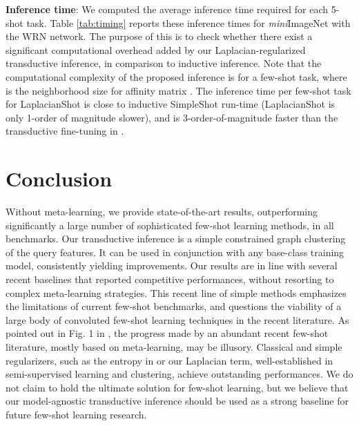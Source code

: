 \documentclass{article}
\begin{document}
\textbf{Inference time}: We computed the average inference time required for each 5-shot task. Table \ref{tab:timing} reports these inference times for \textit{mini}ImageNet with the WRN network. The purpose of this is to check whether there exist a significant computational overhead added by our Laplacian-regularized transductive inference, in comparison to inductive inference. Note that the computational complexity of the proposed inference is  for a few-shot task, where  is the neighborhood size for affinity matrix . The inference time per few-shot task for LaplacianShot is close to inductive SimpleShot run-time (LaplacianShot is only 1-order of magnitude slower), and is 3-order-of-magnitude faster than the transductive fine-tuning in \cite{Dhillon2020A}. 

\section{Conclusion}
Without meta-learning, we provide state-of-the-art results, outperforming significantly a large number of sophisticated few-shot learning methods, in all benchmarks. Our transductive inference is a simple constrained graph clustering of the query features. It can be used in conjunction with any base-class training model, consistently yielding improvements. Our results are in line with several recent baselines \cite{Dhillon2020A,chen2018a,wang2019simpleshot} that reported competitive performances, without resorting to complex meta-learning strategies. This recent line of simple methods emphasizes the limitations of current few-shot benchmarks, and questions the viability of a large body of convoluted few-shot learning techniques in the recent literature. As pointed out in Fig. 1 in \cite{Dhillon2020A}, the progress made by an abundant recent few-shot literature, mostly based on meta-learning, may be illusory. Classical and simple regularizers, such as the entropy in \cite{Dhillon2020A} or our Laplacian term, well-established in semi-supervised learning and clustering, achieve outstanding performances. We do not claim to hold the ultimate solution for few-shot learning, but we believe that our model-agnostic transductive inference should be used as a strong baseline for future few-shot learning research.



\end{document}
